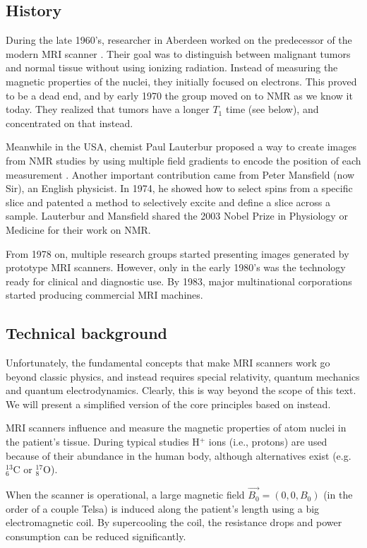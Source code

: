 \subsection{History}\label{ssec:mrihist}
During the late 1960's, researcher in Aberdeen worked on the predecessor of the
modern MRI scanner \cite{mrihistory}. Their goal was to distinguish between
malignant tumors and normal tissue without using ionizing radiation. Instead of
measuring the magnetic properties of the nuclei, they initially focused on
electrons. This proved to be a dead end, and by early 1970 the group moved on to
NMR as we know it today. They realized that tumors have a longer $T_1$ time
(see below), and concentrated on that instead.

Meanwhile in the USA, chemist Paul Lauterbur proposed a way to create images
from NMR studies by using multiple field gradients to encode the position of
each measurement \cite{lauterbur1973}. Another important contribution came from
Peter Mansfield (now Sir), an English physicist. In 1974, he showed how to
select spins from a specific slice and patented a method to selectively excite
and define a slice across a sample. Lauterbur and Mansfield shared the 2003
Nobel Prize in Physiology or Medicine for their work on NMR.

From 1978 on, multiple research groups started presenting images generated by
prototype MRI scanners. However, only in the early 1980's was the technology 
ready for clinical and diagnostic use. By 1983, major multinational corporations
started producing commercial MRI machines.

\subsection{Technical background}
Unfortunately, the fundamental concepts that make MRI scanners work go beyond
classic physics, and instead requires special relativity, quantum mechanics and
quantum electrodynamics. Clearly, this is way beyond the scope of this text. We
will present a simplified version of the core principles based on
\cite{suetens} instead.

MRI scanners influence and measure the magnetic properties of atom nuclei in the
patient's tissue. During typical studies H$^+$ ions (i.e., protons) are used
because of their abundance in the human body, although alternatives exist
(e.g. ${}^{13}_6$C or ${}^{17}_8$O).

When the scanner is operational, a large magnetic field $\vec{B_0} = (0,0,B_0)$
(in the order of a couple Telsa) is induced along the patient's length using a
big electromagnetic coil. By supercooling the coil, the resistance drops and
power consumption can be reduced significantly.

